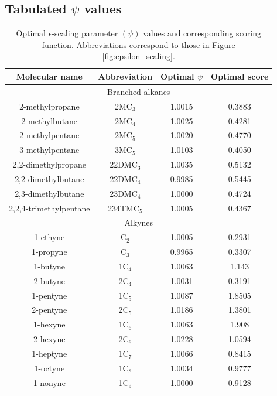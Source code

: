\documentclass[journal=jctc,manuscript=article]{achemso}
\begin{document}
\subsection{Tabulated $\psi$ values}

\begin{table}[htb!]
	\caption{Optimal $\epsilon$-scaling parameter $(\psi)$ values and corresponding scoring function. Abbreviations correspond to those in Figure \ref{fig:epsilon_scaling}.} \label{SI tab: psi opt}
	\begin{center}
		\begin{tabular}{|c|c|c|c|}
			\hline
			Molecular name & Abbreviation & Optimal $\psi$ & Optimal score \\ \hline
			\multicolumn{4}{|c|}{Branched alkanes} \\ \hline
			2-methylpropane & 2MC$_3$ & 1.0015 & 0.3883 \\
			2-methylbutane & 2MC$_4$ & 1.0025 & 0.4281 \\
			2-methylpentane & 2MC$_5$ & 1.0020 & 0.4770 \\
			3-methylpentane & 3MC$_5$ & 1.0103 & 0.4050 \\
			2,2-dimethylpropane & 22DMC$_3$ & 1.0035 & 0.5132 \\
			2,2-dimethylbutane & 22DMC$_4$ & 0.9985 & 0.5445 \\
			2,3-dimethylbutane & 23DMC$_4$ & 1.0000 & 0.4724 \\
			2,2,4-trimethylpentane & 234TMC$_5$ & 1.0005 & 0.4367 \\ \hline	
			\multicolumn{4}{|c|}{Alkynes} \\ \hline
			1-ethyne & C$_2$ & 1.0005 & 0.2931 \\
			1-propyne & C$_3$ & 0.9965 & 0.3307 \\
			1-butyne & 1C$_4$ & 1.0063 & 1.143 \\
			2-butyne & 2C$_4$ & 1.0031 & 0.3191 \\
			1-pentyne & 1C$_5$ & 1.0087 & 1.8505 \\
			2-pentyne & 2C$_5$ & 1.0186 & 1.3801 \\
			1-hexyne & 1C$_6$ & 1.0063 & 1.908 \\
			2-hexyne & 2C$_6$ & 1.0228 & 1.0594 \\
			1-heptyne & 1C$_7$ & 1.0066 & 0.8415 \\
			1-octyne & 1C$_8$ & 1.0034 & 0.9777 \\
			1-nonyne & 1C$_9$ & 1.0000 & 0.9128 \\
			\hline
		\end{tabular}
	\end{center}
\end{table}
\end{document}
